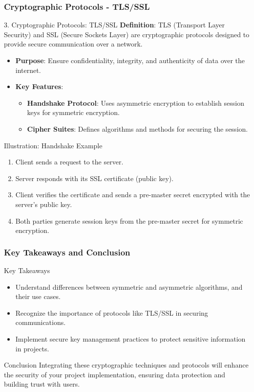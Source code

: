 \documentclass{beamer}
\begin{document}
\begin{frame}[fragile]
    \frametitle{Cryptographic Protocols - TLS/SSL}
    \begin{block}{3. Cryptographic Protocols: TLS/SSL}
        \textbf{Definition}: TLS (Transport Layer Security) and SSL (Secure Sockets Layer) are cryptographic protocols designed to provide secure communication over a network.

        \begin{itemize}
            \item \textbf{Purpose}: Ensure confidentiality, integrity, and authenticity of data over the internet.
            \item \textbf{Key Features}:
            \begin{itemize}
                \item \textbf{Handshake Protocol}: Uses asymmetric encryption to establish session keys for symmetric encryption.
                \item \textbf{Cipher Suites}: Defines algorithms and methods for securing the session.
            \end{itemize}
        \end{itemize}
    \end{block}
    \begin{block}{Illustration: Handshake Example}
        \begin{enumerate}
            \item Client sends a request to the server.
            \item Server responds with its SSL certificate (public key).
            \item Client verifies the certificate and sends a pre-master secret encrypted with the server's public key.
            \item Both parties generate session keys from the pre-master secret for symmetric encryption.
        \end{enumerate}
    \end{block}
\end{frame}

\begin{frame}[fragile]
    \frametitle{Key Takeaways and Conclusion}
    \begin{block}{Key Takeaways}
        \begin{itemize}
            \item Understand differences between symmetric and asymmetric algorithms, and their use cases.
            \item Recognize the importance of protocols like TLS/SSL in securing communications.
            \item Implement secure key management practices to protect sensitive information in projects.
        \end{itemize}
    \end{block}
    \begin{block}{Conclusion}
        Integrating these cryptographic techniques and protocols will enhance the security of your project implementation, ensuring data protection and building trust with users.
    \end{block}
\end{frame}
\end{document}
